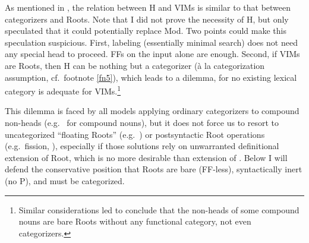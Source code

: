 \documentclass[output=paper]{langsci/langscibook}
\begin{document}
As mentioned in , the relation between H and \glspl{VIM} is similar to
that between categorizers and Roots. Note that I did not prove the necessity of
H, but only speculated that it could potentially replace  Mod.
Two points could make this speculation suspicious. First, labeling (essentially
minimal search) does not need any special head to proceed. FFs on the 
input alone are enough. Second, if \glspl{VIM} are Roots, then H can be nothing but a
categorizer (\`{a} la categorization assumption, cf.\ footnote \ref{fn5}), which
leads to a dilemma, for no existing lexical category is adequate for
\glspl{VIM}.\footnote{Similar considerations led \citet{deBeldervanKoppen2016} to
conclude that the non-heads of some  compound nouns are bare Roots without any
functional category, not even categorizers.}%

This dilemma is faced by all models applying ordinary categorizers to compound
non-heads (e.g.\ \citealt{Harley2009} for compound nouns), but it does not
force us to resort to uncategorized ``floating Roots'' (e.g.\
\citealt{deBeldervanKoppen2016}) or postsyntactic Root operations (e.g.\
fission, \citealt{deBelder2017}), especially if those solutions rely on
unwarranted definitional extension of Root, which is no more desirable than
extension of \isi{Merge}. Below I will defend the conservative position that Roots
are bare (FF-less), syntactically inert (no {\textsurd}P), and must be
categorized.
\end{document}
